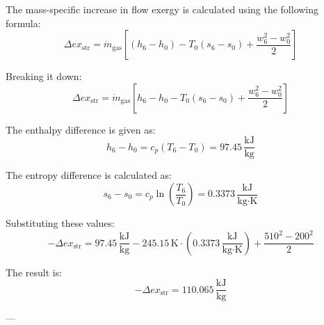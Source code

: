 The mass-specific increase in flow exergy is calculated using the following formula:  
\[
\Delta ex_{\text{str}} = \dot{m}_{\text{gas}} \left[ (h_6 - h_0) - T_0 (s_6 - s_0) + \frac{w_6^2 - w_0^2}{2} \right]
\]  

Breaking it down:  
\[
\Delta ex_{\text{str}} = \dot{m}_{\text{gas}} \left[ h_6 - h_0 - T_0 (s_6 - s_0) + \frac{w_6^2 - w_0^2}{2} \right]
\]  

The enthalpy difference is given as:  
\[
h_6 - h_0 = c_p (T_6 - T_0) = 97.45 \, \frac{\text{kJ}}{\text{kg}}
\]  

The entropy difference is calculated as:  
\[
s_6 - s_0 = c_p \ln \left( \frac{T_6}{T_0} \right) = 0.3373 \, \frac{\text{kJ}}{\text{kg·K}}
\]  

Substituting these values:  
\[
-\Delta ex_{\text{str}} = 97.45 \, \frac{\text{kJ}}{\text{kg}} - 245.15 \, \text{K} \cdot (0.3373 \, \frac{\text{kJ}}{\text{kg·K}}) + \frac{510^2 - 200^2}{2}
\]  

The result is:  
\[
-\Delta ex_{\text{str}} = 110.065 \, \frac{\text{kJ}}{\text{kg}}
\]  

---